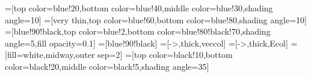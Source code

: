 \pgfplotsset{compat=1.13}
\tikzset{>=latex} %
=[top color=blue!20,bottom color=blue!40,middle color=blue!30,shading angle=10]
=[very thin,top color=blue!60,bottom color=blue!80,shading angle=10]
=[blue!90!black,top color=blue!2,bottom color=blue!80!black!70,shading angle=5,fill opacity=0.1]
=[blue!90!black]
=[->,thick,veccol]
=[->,thick,Ecol]
=[fill=white,midway,outer sep=2]
=[top color=black!10,bottom color=black!20,middle color=black!5,shading angle=35]
\def\L{2.2}
\def\H{2.2}
\def\offset{2.0}
\def\W{0.30}
\def\Nx{5}
\def\Ny{5}



